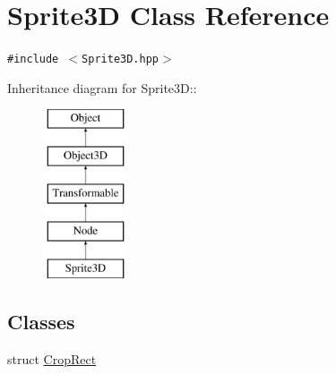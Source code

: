 \hypertarget{classm3g_1_1Sprite3D}{
\section{Sprite3D Class Reference}
\label{classm3g_1_1Sprite3D}
}
{\tt \#include $<$Sprite3D.hpp$>$}

Inheritance diagram for Sprite3D::\begin{figure}[H]
\begin{center}
\leavevmode
\includegraphics[height=5cm]{classm3g_1_1Sprite3D}
\end{center}
\end{figure}
\subsection*{Classes}
\begin{CompactItemize}
\item 
struct \hyperlink{structm3g_1_1Sprite3D_1_1CropRect}{CropRect}
\end{CompactItemize}
